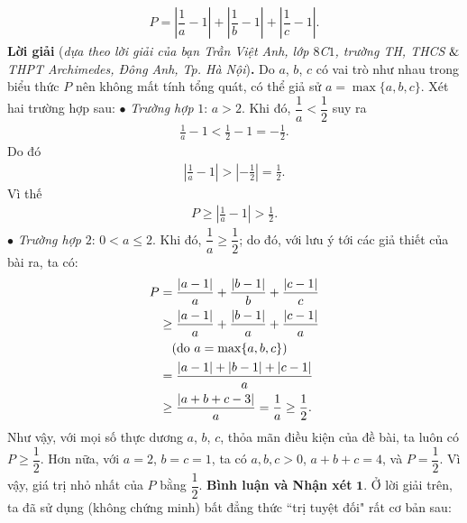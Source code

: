 \begin{multicols}{2}
	\begin{align*}
		P=\left|\dfrac 1a-1\right|+\left|\dfrac 1b-1\right|+\left|\dfrac 1c-1\right|.
	\end{align*}
	\textbf{\color{thachthuctoanhoc}Lời giải} (\textit{dựa theo lời giải của bạn Trần Việt Anh, lớp $8$C$1$, trường TH, THCS $\color{black}\&$ THPT Archimedes, Đông Anh, Tp. Hà Nội})\textbf{\color{thachthuctoanhoc}.}
	\vskip 0.05cm
	Do $a$, $b$, $c$ có vai trò như nhau trong biểu thức $P$ nên không mất tính tổng quát, có thể giả sử $a = \max\{a, b, c\}$.
	\vskip 0.05cm
	Xét hai trường hợp sau:
	\vskip 0.05cm
	$\bullet$ \textit{Trường hợp} $1$: $a > 2$.
	\vskip 0.05cm
	Khi đó, $\dfrac{1}{a} < \dfrac{1}{2}$  suy ra
	\begin{align*}
		\frac{1}{a} - 1 < \frac{1}{2} - 1 =  - \frac{1}{2}.
	\end{align*}
	Do đó
	\begin{align*}
		\left| {\frac{1}{a} - 1} \right| > \left| { - \frac{1}{2}} \right| = \frac{1}{2}.
	\end{align*}
	Vì thế
	\begin{align*}
		P \ge \left| {\frac{1}{a} - 1} \right| > \frac{1}{2}.
	\end{align*}
	$\bullet$ \textit{Trường hợp} $2$: $0 < a \le 2$.
	\vskip 0.05cm
	Khi đó, $\dfrac{1}{a} \ge \dfrac{1}{2}$; do đó, với lưu ý tới các giả thiết của bài ra, ta có:
	\begin{align*}
			P &= \frac{{\left| {a - 1} \right|}}{a} + \frac{{\left| {b - 1} \right|}}{b} + \frac{{\left| {c - 1} \right|}}{c} \\
			&\ge \frac{{\left| {a - 1} \right|}}{a} + \frac{{\left| {b - 1} \right|}}{a} + \frac{{\left| {c - 1} \right|}}{a}\\
			&\quad({\text{\color{black} do } } a = \max \{ a,b,c\} )\\
			 &= \frac{{\left| {a - 1} \right| + \left| {b - 1} \right| + \left| {c - 1} \right|}}{a} \\
			 &\ge \frac{{\left| {a + b + c - 3} \right|}}{a} = \frac{1}{a} \ge \frac{1}{2}.
	\end{align*}
	Như vậy, với mọi số thực dương $a$, $b$, $c$, thỏa mãn điều kiện của đề bài, ta luôn có  $P \ge \dfrac{1}{2}$.
	\vskip 0.05cm
	Hơn nữa, với $a \!=\! 2$, $b \!=\! c \!=\! 1$, ta có $a, b, c \!>\! 0$, $a + b + c = 4$, và  $P = \dfrac{1}{2}$.
	\vskip 0.05cm
	Vì vậy, giá trị nhỏ nhất của $P$ bằng  $\dfrac{1}{2}$.
	\vskip 0.05cm
	\textbf{\color{thachthuctoanhoc}Bình luận và Nhận xét}
	\vskip 0.05cm
	$\pmb{1.}$ Ở lời giải trên, ta đã sử dụng (không chứng minh) bất đẳng thức ``trị tuyệt đối" rất cơ bản sau:

\end{multicols}
